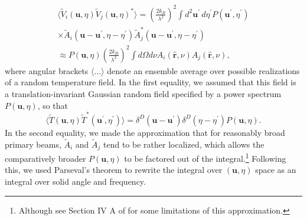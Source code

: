 \documentclass[twocolumn,apj,numberedappendix]{emulateapj}
\newcommand{\rhat}{\hat{\mathbf{r}}}
\begin{document}
\begin{eqnarray}
\label{eq:visCrossCorr}
\langle \widetilde{V}_i(\mathbf{u},\eta) \widetilde{V}_j(\mathbf{u},\eta)^*\rangle = \left( \frac{2 k_B}{\lambda^2} \right)^2 \int d^2 \mathbf{u}^\prime \, d\eta^\prime  P(\mathbf{u}^\prime , \eta^\prime) \nonumber \\
\times \widetilde{A}_i (\mathbf{u} -\mathbf{u}^\prime, \eta-\eta^\prime) \widetilde{A}_j^* (\mathbf{u} -\mathbf{u}^\prime, \eta-\eta^\prime) \nonumber \\
\approx P(\mathbf{u} , \eta) \left( \frac{2 k_B}{\lambda^2} \right)^2 \int d\Omega d\nu A_i (\rhat,\nu) A_j (\rhat,\nu), \quad
\end{eqnarray}
where angular brackets $\langle \dots \rangle$ denote an ensemble average over possible realizations of a random temperature field. In the first equality, we assumed that this field is a translation-invariant Gaussian random field specified by a power spectrum $P(\mathbf{u}, \eta)$, so that
\begin{equation}
\langle \widetilde{T}(\mathbf{u} , \eta) \widetilde{T}^*(\mathbf{u}^\prime , \eta^\prime)\rangle = \delta^{D} (\mathbf{u} - \mathbf{u}^\prime) \delta^D (\eta - \eta^\prime) P(\mathbf{u}, \eta).
\end{equation}
In the second equality, we made the approximation that for reasonably broad primary beams, $\widetilde{A}_i $ and $\widetilde{A}_j$ tend to be rather localized, which allows the comparatively broader $P(\mathbf{u}, \eta)$ to be factored out of the integral.\footnote{Although see Section IV A of \citet{liu_et_al2014b} for some limitations of this approximation.} Following this, we used Parseval's theorem to rewrite the integral over $(\mathbf{u},\eta)$ space as an integral over solid angle and frequency.
\end{document}
